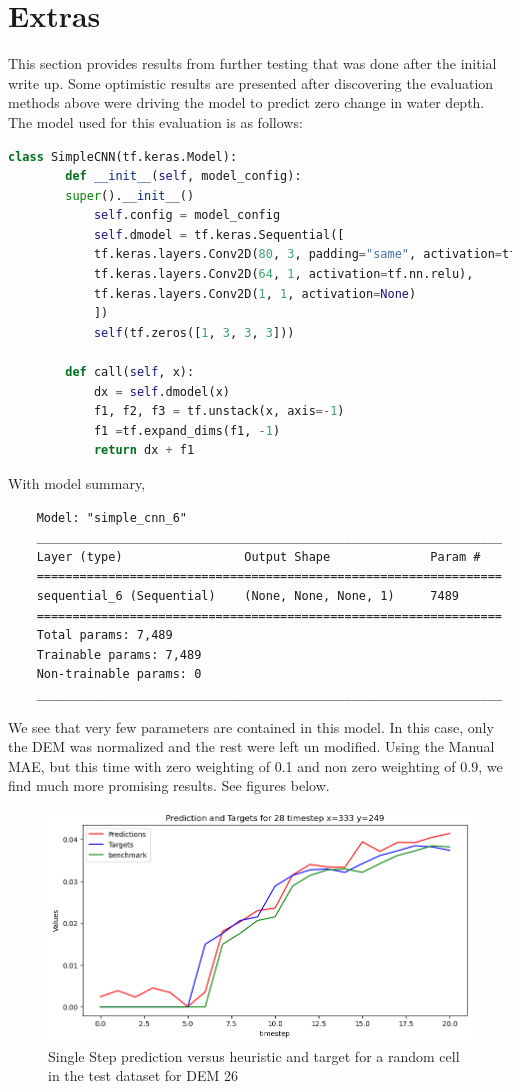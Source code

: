 \section{Extras}
\label{Extra}
This section provides results from further testing that was done after the initial write up. Some optimistic results are presented after discovering the evaluation methods above were driving the model to predict zero change in water depth. The model used for this evaluation is as follows:

\begin{lstlisting}[language=Python]
	class SimpleCNN(tf.keras.Model):
		def __init__(self, model_config):
		super().__init__()
			self.config = model_config
			self.dmodel = tf.keras.Sequential([
			tf.keras.layers.Conv2D(80, 3, padding="same", activation=tf.nn.relu),
			tf.keras.layers.Conv2D(64, 1, activation=tf.nn.relu),
			tf.keras.layers.Conv2D(1, 1, activation=None)
			])
			self(tf.zeros([1, 3, 3, 3]))
		
		def call(self, x):
			dx = self.dmodel(x)
			f1, f2, f3 = tf.unstack(x, axis=-1)
			f1 =tf.expand_dims(f1, -1)
			return dx + f1
\end{lstlisting}
With model summary,

\begin{verbatim}
	Model: "simple_cnn_6"
	_________________________________________________________________
	Layer (type)                 Output Shape              Param #   
	=================================================================
	sequential_6 (Sequential)    (None, None, None, 1)     7489      
	=================================================================
	Total params: 7,489
	Trainable params: 7,489
	Non-trainable params: 0
	_________________________________________________________________
\end{verbatim}
We see that very few parameters are contained in this model. In this case, only the DEM was normalized and the rest were left un modified. Using the Manual MAE, but this time with zero weighting of 0.1 and non zero weighting of 0.9, we find much more promising results. See figures below.

\begin{figure}[tbph]
	\centering
	\includegraphics[width=0.8\linewidth, height=0.3\textheight]{Figures/Results/extra/extra_single_step}
	\caption[Extra Single Step prediction]{Single Step prediction versus heuristic and target for a random cell in the test dataset for DEM 26}
	\label{fig:extrasinglestep}
\end{figure}


